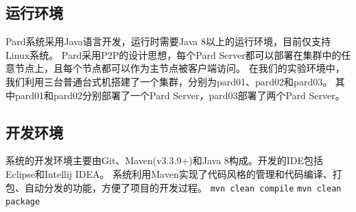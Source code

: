 \documentclass[a4paper, 12pt]{ctexart}
\begin{document}
\subsection{运行环境}
Pard系统采用Java语言开发，运行时需要Java 8以上的运行环境，目前仅支持Linux系统。
Pard采用P2P的设计思想，每个Pard Server都可以部署在集群中的任意节点上，且每个节点都可以作为主节点被客户端访问。
在我们的实验环境中，我们利用三台普通台式机搭建了一个集群，分别为pard01、pard02和pard03。
其中pard01和pard02分别部署了一个Pard Server，pard03部署了两个Pard Server。

\subsection{开发环境}
系统的开发环境主要由Git、Maven(v3.3.9+)和Java 8构成。开发的IDE包括Eclipse和Intellij IDEA。
系统利用Maven实现了代码风格的管理和代码编译、打包、自动分发的功能，方便了项目的开发过程。
\lstinline|mvn clean compile|
\lstinline[language=bash]|mvn clean package|
 
\end{document}
